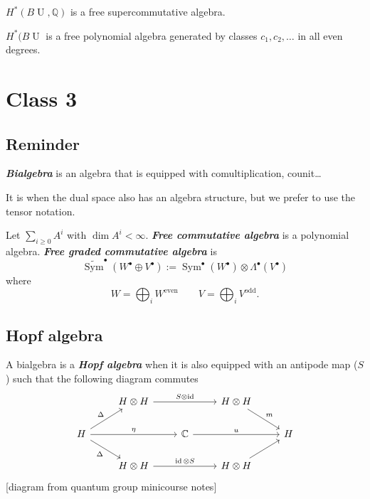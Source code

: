 \begin{coro}
	$H^* (B\operatorname{U},\mathbb{Q})$ is a free supercommutative algebra.
\end{coro}

\begin{claim}
	$H^*(B\operatorname{U}$ is a free polynomial algebra generated by classes $c_1,c_2,\ldots$ in all even degrees.
\end{claim}

\section{Class 3}

\subsection{Reminder}

\begin{defn}
	\textit{\textbf{Bialgebra}} is an algebra that is  equipped with comultiplication, counit…
\end{defn}

\begin{remark}
	It is when the dual space also has an algebra structure, but we prefer to use the tensor notation.
\end{remark}

Let $\sum_{i \geq 0}A^i$ with $\dim A^i<\infty$. \textit{\textbf{Free commutative algebra}} is a polynomial algebra.  \textit{\textbf{Free graded commutative algebra}} is
\[\widetilde{\operatorname{Sym}}^\bullet(W^\bullet \oplus V^\bullet):=\operatorname{Sym}^\bullet(W^\bullet)\otimes \Lambda^\bullet(V^\bullet)\]
where
\[W=\bigoplus_{i} W^{\operatorname{even}} \qquad V=\bigoplus_{i}V^{\operatorname{odd}}. \]

\subsection{Hopf algebra}

\begin{defn}
	A bialgebra is a \textit{\textbf{Hopf algebra}} when it is also equipped with an antipode map ($S$) such that the following diagram commutes
\[\begin{tikzcd}
	&H\otimes H\arrow[rr,"S\otimes \operatorname{id}"]&&H\otimes H\arrow[rd,"m"]\\
	H\arrow[ur,"\Delta"]\arrow[dr,swap,"\Delta"]\arrow[rr,"\eta"]&&\mathbb{C}\arrow[rr,"u"]&&H\\
								     &H\otimes H\arrow[rr,"\operatorname{id}\otimes S"]&&H\otimes H\arrow[ur]
\end{tikzcd}\]
[diagram from quantum group minicourse notes]

	\end{defn}

